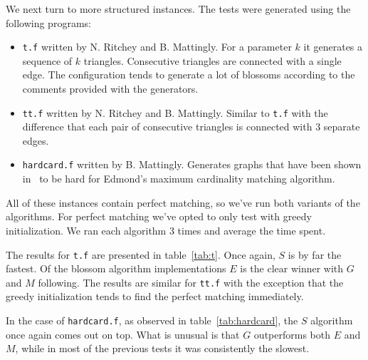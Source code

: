 We next turn to more structured instances. The tests were generated using the following programs:

\begin{itemize}
    \item \texttt{t.f} written by N. Ritchey and B. Mattingly. For a parameter $k$ it generates a sequence of $k$ triangles. Consecutive triangles are connected with a single edge. The configuration tends to generate a lot of blossoms according to the comments provided with the generators.
    \item \texttt{tt.f} written by N. Ritchey and B. Mattingly. Similar to \texttt{t.f} with the difference that each pair of consecutive triangles is connected with $3$ separate edges.
    \item \texttt{hardcard.f} written by B. Mattingly. Generates graphs that have been shown in~\cite{gabow1976efficient} to be hard for Edmond's maximum cardinality matching algorithm.
\end{itemize}

All of these instances contain perfect matching, so we've run both variants of the algorithms. For perfect matching we've opted to only test with greedy initialization. We ran each algorithm $3$ times and average the time spent.

The results for \texttt{t.f} are presented in table~\ref{tab:t}. Once again, $S$ is by far the fastest. Of the blossom algorithm implementations $E$ is the clear winner with $G$ and $M$ following. The results are similar for \texttt{tt.f} with the exception that the greedy initialization tends to find the perfect matching immediately. 

In the case of \texttt{hardcard.f}, as observed in table~\ref{tab:hardcard}, the $S$ algorithm once again comes out on top. What is unusual is that $G$ outperforms both $E$ and $M$, while in most of the previous tests it was consistently the slowest.

